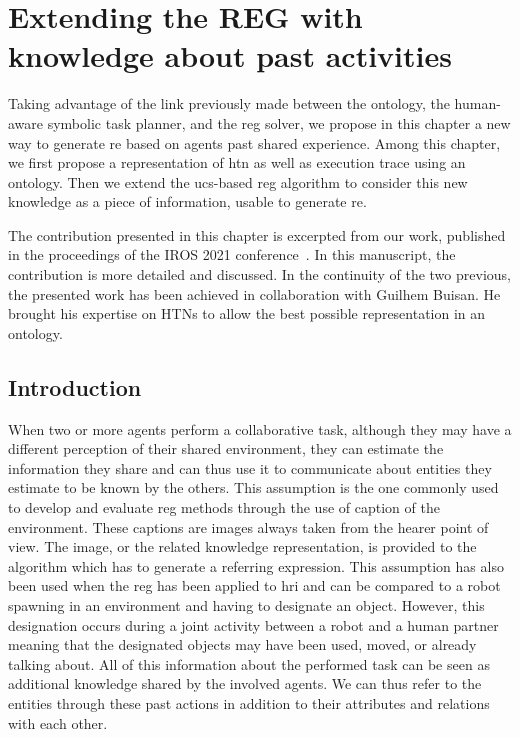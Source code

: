 \ifdefined{}
\else
\setcounter{chapter}{6} %
\dominitoc
\faketableofcontents
\fi

\chapter{Extending the REG with knowledge about past activities}
\minitoc
\label{chap:6}

Taking advantage of the link previously made between the ontology, the human-aware symbolic task planner, and the \acrshort{reg} solver, we propose in this chapter a new way to generate \acrlong{re} based on agents past shared experience. Among this chapter, we first propose a representation of \acrshort{htn} as well as execution trace using an ontology. Then we extend the \acrshort{ucs}-based \acrshort{reg} algorithm to consider this new knowledge as a piece of information, usable to generate \acrlong{re}.

The contribution presented in this chapter is excerpted from our work, published in the proceedings of the IROS 2021 conference~\cite{sarthou_2021_extending}. In this manuscript, the contribution is more detailed and discussed. In the continuity of the two previous, the presented work has been achieved in collaboration with Guilhem Buisan. He brought his expertise on HTNs to allow the best possible representation in an ontology.

\section{Introduction}

When two or more agents perform a collaborative task, although they may have a different perception of their shared environment, they can estimate the information they share and can thus use it to communicate about entities they estimate to be known by the others. This assumption is the one commonly used to develop and evaluate \acrfull{reg} methods through the use of caption of the environment\cite{duboue_2015_evaluating}. These captions are images always taken from the hearer point of view. The image, or the related knowledge representation, is provided to the algorithm which has to generate a referring expression. This assumption has also been used when the \acrshort{reg} has been applied to \acrfull{hri} and can be compared to a robot spawning in an environment and having to designate an object. However, this designation occurs during a joint activity between a robot and a human partner meaning that the designated objects may have been used, moved, or already talking about. All of this information about the performed task can be seen as additional knowledge shared by the involved agents. We can thus refer to the entities through these past actions in addition to their attributes and relations with each other.


